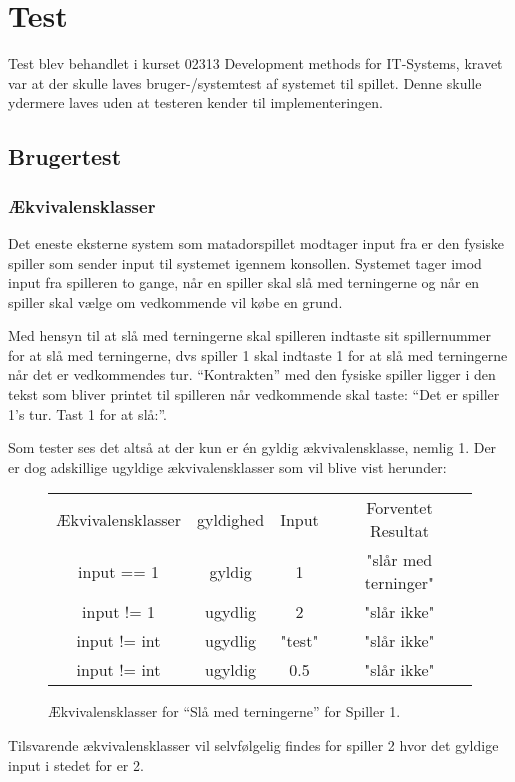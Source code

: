 \chapter{Test} \label{chap:Test}
Test blev behandlet i kurset 02313 Development methods for IT-Systems, kravet var at der skulle laves bruger-/systemtest af systemet til spillet. Denne skulle ydermere laves uden at testeren kender til implementeringen.

\section{Brugertest}

\subsection{Ækvivalensklasser}
Det eneste eksterne system som matadorspillet modtager input fra er den fysiske spiller som sender input til systemet igennem konsollen. Systemet tager imod input fra spilleren to gange, når en spiller skal slå med terningerne og når en spiller skal vælge om vedkommende vil købe en grund.

Med hensyn til at slå med terningerne skal spilleren indtaste sit spillernummer for at slå med terningerne, dvs spiller 1 skal indtaste 1 for at slå med terningerne når det er vedkommendes tur. \enquote{Kontrakten} med den fysiske spiller ligger i den tekst som bliver printet til spilleren når vedkommende skal taste: \enquote{Det er spiller 1's tur. Tast 1 for at slå:}.

Som tester ses det altså at der kun er én gyldig ækvivalensklasse, nemlig 1. Der er dog adskillige ugyldige ækvivalensklasser som vil blive vist herunder:
\begin{figure}
\caption{Ækvivalensklasser for \enquote{Slå med terningerne} for Spiller 1.}
\label{fig:EkviTerninger}
\centering
\begin{tabular}{cccc}
Ækvivalensklasser & gyldighed & Input  & Forventet Resultat \\ 
input == 1 & gyldig & 1 & "slår med terninger"\\ 
input != 1 & ugydlig & 2 & "slår ikke"\\ 
input != int & ugydlig & "test" & "slår ikke"\\
input != int & ugyldig & 0.5 & "slår ikke" \\
\end{tabular} 
\end{figure}

Tilsvarende ækvivalensklasser vil selvfølgelig findes for spiller 2 hvor det gyldige input i stedet for er 2.


